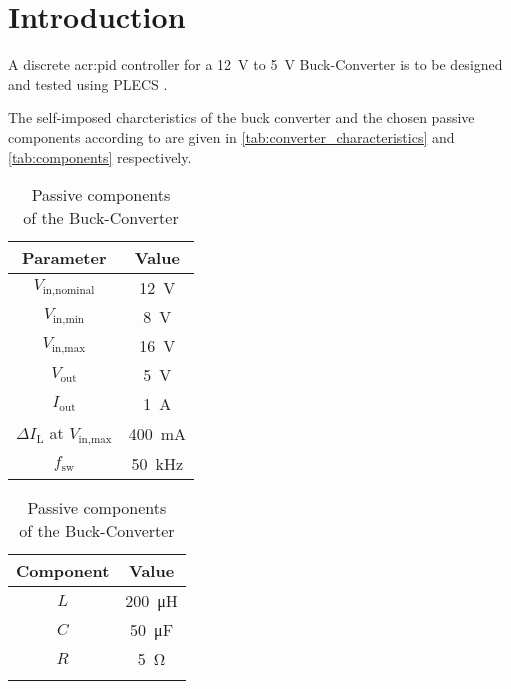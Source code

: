 \chapter{Introduction}
\label{chapter:introduction}

A discrete \gls{acr:pid} controller for a \qty{12}{\volt} to \qty{5}{\volt} Buck-Converter is to be designed and tested using PLECS \autocite{PLECSPlexim}.

The self-imposed charcteristics of the buck converter and the chosen passive components according to \autocite{BuckConverter} are given in \autoref{tab:converter_characteristics} and \autoref{tab:components} respectively.

\begin{table}[htbp]
    \centering
    \begin{minipage}{0.45\textwidth}
        \centering
        \begin{tabular}{c|c}
            Parameter & Value \\ \hline
            $V_{\text{in,nominal}}$ & \qty{12}{\volt} \\ 
            $V_{\text{in,min}}$ & \qty{8}{\volt} \\
            $V_{\text{in,max}}$ & \qty{16}{\volt} \\  
            $V_{\text{out}}$ & \qty{5}{\volt} \\ 
            $I_{\text{out}}$ & \qty{1}{\ampere} \\
            $\Delta I_{\text{L}}$ at $V_{\text{in,max}}$ & \qty{400}{\milli\ampere} \\
            $f_{\text{sw}}$ & \qty{50}{\kilo\hertz}
        \end{tabular}
        \caption{Buck-Converter Characteristics}
        \label{tab:converter_characteristics}
    \end{minipage}\hfill
    \begin{minipage}{0.45\textwidth}
        \centering
        \begin{tabular}{c|c}
            Component & Value \\ \hline
            $L$ & \qty{200}{\micro\henry} \\ 
            $C$ & \qty{50}{\micro\farad} \\ 
            $R$ & \qty{5}{\ohm} \\ 
             \\
        \end{tabular}
        \caption{Passive components \\ of the Buck-Converter}
        \label{tab:components}
    \end{minipage}
\end{table}

